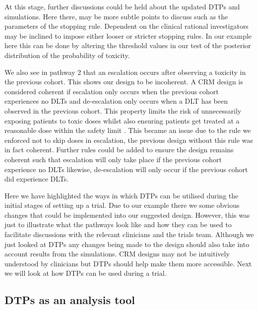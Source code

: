 At this stage, further discussions could be held about the updated DTPs and simulations. Here there, may be more subtle points to discuss such as the parameters of the stopping rule. Dependent on the clinical rational investigators may be inclined to impose either looser or stricter stopping rules. In our example here this can be done by altering the threshold values in our test of the posterior distribution of the probability of toxicity. 

We also see in pathway 2 that an escalation occurs after observing a toxicity in the previous cohort. This shows our design to be incoherent. A CRM design is considered coherent if escalation only occurs when the previous cohort experiences no DLTs and de-escalation only occurs when a DLT has been observed in the previous cohort. This property limits the risk of unnecessarily exposing patients to toxic doses whilst also ensuring patients get treated at a reasonable dose within the safety limit \cite{cheungDoseFindingContinual2011}. This became an issue due to the rule we enforced not to skip doses in escalation, the previous design without this rule was in fact coherent. Further rules could be added to ensure the design remains coherent such that escalation will only take place if the previous cohort experience no DLTs likewise, de-escalation will only occur if the previous cohort did experience DLTs. 

Here we have highlighted the ways in which DTPs can be utilised during the initial stages of setting up a trial. Due to our example there we some obvious changes that could be implemented into our suggested design. However, this was just to illustrate what the pathways look like and how they can be used to facilitate discussions with the relevant clinicians and the trials team. Although we just looked at DTPs any changes being made to the design should also take into account results from the simulations. CRM designs may not be intuitively understood by clinicians but DTPs should help make them more accessible. Next we will look at how DTPs can be used during a trial.  

\subsection{DTPs as an analysis tool}